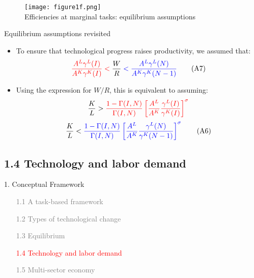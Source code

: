 \documentclass[notes=show]{beamer}
\begin{document}
\newpage
\begin{center}
\begin{figure}
\texttt{[image: figure1f.png]}
\\ Efficiencies at marginal tasks: equilibrium assumptions
\end{figure} 
\end{center}
\newpage

\begin{frame}{Equilibrium assumptions revisited}
\begin{itemize}
\item To ensure that technological progress raises productivity, we assumed that:
\[
\color{red} \frac{A^{L}\gamma^{L}(I)}{A^{K}\gamma^{K}(I)} < \color{black} \frac{W}{R} \color{blue} < \frac{A^{L}\gamma^{L}(N)}{A^{K}\gamma^{K}(N-1)} \color{black} \tag{A7}
\] \label{eqA7}
\item Using the expression for $W/R$, this is equivalent to assuming:
\[
\color{black} \frac{K}{L} > \color{red} \frac{1-\Gamma(I,N)}{\Gamma(I,N)} \left[ \frac{A^{L}}{A^{K}} \frac{\gamma^{L}(I)}{\gamma^{K}(I)} \right]^{\sigma}
\]
\[
\color{black} \frac{K}{L} < \color{blue} \frac{1-\Gamma(I,N)}{\Gamma(I,N)} \left[ \frac{A^{L}}{A^{K}} \frac{\gamma^{L}(N)}{\gamma^{K}(N-1)} \right]^{\sigma} \color{black} \tag{A6}
\]
\end{itemize}
\end{frame}

\subsection{1.4 Technology and labor demand}

\begin{frame}{1. Conceptual Framework}
\begin{itemize}
\item[\textcolor{gray}{1.1}] \textcolor{gray}{A task-based framework} \bigskip
\item[\textcolor{gray}{1.2}] \textcolor{gray}{Types of technological change} \bigskip
\item[\textcolor{gray}{1.3}] \textcolor{gray}{Equilibrium} \bigskip
\item[\textcolor{red}{1.4}] \textcolor{red}{Technology and labor demand} \bigskip
\item[\textcolor{gray}{1.5}] \textcolor{gray}{Multi-sector economy} 
\end{itemize}
\end{frame}
\end{document}
